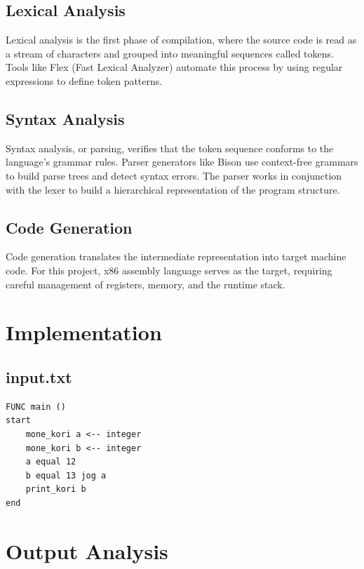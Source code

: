 \documentclass[12pt,a4paper]{article}
\begin{document}
\subsection*{Lexical Analysis}
Lexical analysis is the first phase of compilation, where the source code is read as a stream of characters and grouped into meaningful sequences called tokens. Tools like Flex (Fast Lexical Analyzer) automate this process by using regular expressions to define token patterns.

\subsection*{Syntax Analysis}
Syntax analysis, or parsing, verifies that the token sequence conforms to the language's grammar rules. Parser generators like Bison use context-free grammars to build parse trees and detect syntax errors. The parser works in conjunction with the lexer to build a hierarchical representation of the program structure.

\subsection*{Code Generation}
Code generation translates the intermediate representation into target machine code. For this project, x86 assembly language serves as the target, requiring careful management of registers, memory, and the runtime stack.


\section{Implementation}

\subsection*{input.txt}

\begin{lstlisting}[caption={Input Test Program (Input.txt)}]
FUNC main ()
start
    mone_kori a <-- integer
    mone_kori b <-- integer
    a equal 12
    b equal 13 jog a
    print_kori b
end
\end{lstlisting}


\section{Output Analysis}
\end{document}
